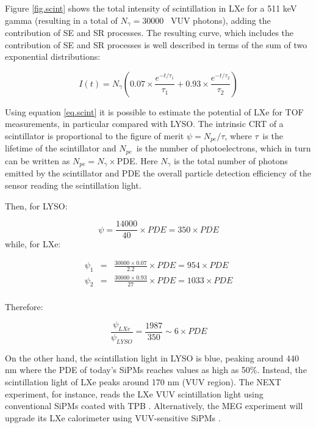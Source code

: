 \documentclass[review]{elsarticle}
\begin{document}
Figure \ref{fig.scint} shows the total intensity of scintillation in LXe for a 511 keV gamma (resulting in a total of $N_\gamma =30000$~ VUV photons), adding the contribution of SE and SR processes. The resulting curve, which includes the contribution of SE and SR processes is well described in terms of the sum of two exponential distributions: 

\begin{equation}
I(t) = N_\gamma (0.07 \times \frac{e^{-t/\tau_1}}{\tau_1} + 0.93 \times \frac{e^{-t/\tau_2}}{\tau_2})
\label{eq.scint}
\end{equation}

Using equation \ref{eq.scint} it is possible to estimate the potential of LXe for TOF measurements, in particular compared with LYSO. The intrinsic CRT of a scintillator is proportional to the figure of merit 
$\psi = N_{pe}/\tau$, where $\tau$~is the lifetime of the scintillator and $N_{pe}$~is the number of photoelectrons, which in turn can be written as $N_{pe} = N_\gamma \times $PDE. Here $N_\gamma$ is the total number of photons emitted by the scintillator and PDE the overall particle detection efficiency of the sensor reading the scintillation light. 

Then, for LYSO: 

\begin{equation}
\psi = \frac{14000}{40} \times PDE = 350 \times PDE
\label{eq.lysoScint}
\end{equation}
%
while, for LXe:

\begin{eqnarray}
\psi_1 &=& \frac{30000 \times 0.07}{2.2} \times PDE = 954 \times PDE \\
\psi_2 &=& \frac{30000 \times 0.93}{27} \times PDE = 1033 \times PDE \\
\end{eqnarray}

Therefore:

\begin{equation}
\frac{\psi_{LXe}}{\psi_{LYSO}} = \frac{1987}{350} \sim 6 \times PDE
\label{eq.ratioScint}
\end{equation}

On the other hand, the scintillation light in LYSO is blue, peaking around 440 nm where the PDE of today's SiPMs reaches values as high as 50\%. Instead, the scintillation light of LXe peaks around 170 nm (VUV region). The NEXT experiment, for instance, reads the LXe VUV scintillation light using conventional SiPMs coated with TPB \cite{Alvarez:2013gxa}. Alternatively, the MEG experiment will upgrade its LXe calorimeter using VUV-sensitive SiPMs \cite{Ogawa:2015ucj}.
\end{document}
